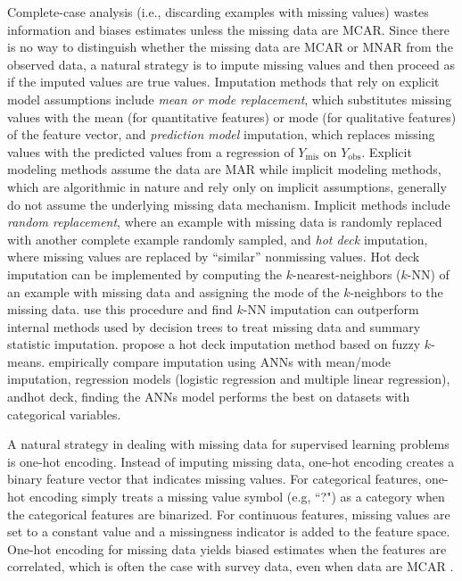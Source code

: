 \documentclass[10pt]{book}
\theoremstyle{definition}
\begin{document}
\par			
{} \label{section:techniques} 

Complete-case analysis (i.e., discarding examples with missing values) wastes information and biases estimates unless the missing data are MCAR. Since there is no way to distinguish whether the missing data are MCAR or MNAR from the observed data, a natural strategy is to impute missing values and then proceed as if the imputed values are true values. Imputation methods that rely on explicit model assumptions include \emph{mean or mode replacement}, which substitutes missing values with the mean (for quantitative features) or mode (for qualitative features) of the feature vector, and \emph{prediction model} imputation, which replaces missing values with the predicted values from a regression of $Y_{\mathrm{mis}}$ on $Y_{\mathrm{obs}}$. Explicit modeling methods assume the data are MAR while implicit modeling methods, which are algorithmic in nature and rely only on implicit assumptions, generally do not assume the underlying missing data mechanism. Implicit methods include \emph{random replacement}, where an example with missing data is randomly replaced with another complete example randomly sampled, and \emph{hot deck} imputation, where missing values are replaced by ``similar'' nonmissing values. Hot deck imputation can be implemented by computing the $k$-nearest-neighbors ($k$-NN) of an example with missing data and assigning the mode of the $k$-neighbors to the missing data. \cite{batista2003analysis} use this procedure and find $k$-NN imputation can outperform internal methods used by decision trees to treat missing data and summary statistic imputation. \cite{li2004} propose a hot deck imputation method based on fuzzy $k$-means. \cite{silva2011} empirically compare imputation using ANNs with mean/mode imputation, regression models (logistic regression and multiple linear regression), andhot deck, finding the ANNs model performs the best on datasets with categorical variables. 

\par
{} 

A natural strategy in dealing with missing data for supervised learning problems is one-hot encoding. Instead of imputing missing data, one-hot encoding creates a binary feature vector that indicates missing values. For categorical features, one-hot encoding simply treats a missing value symbol (e.g, ``?") as a category when the categorical features are binarized. For continuous features, missing values are set to a constant value and a missingness indicator is added to the feature space. One-hot encoding for missing data yields biased estimates when the features are correlated, which is often the case with survey data, even when data are MCAR \citep{jones1996}. 
\end{document}
